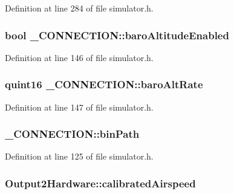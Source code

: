 Definition at line 284 of file simulator.\-h.

\hypertarget{group___h_i_t_l_plugin_ga6700d3be0f4ef9211d6f34569034b7a8}{
\subsubsection[{baro\-Altitude\-Enabled}]{\setlength{\rightskip}{0pt plus 5cm}bool \-\_\-\-C\-O\-N\-N\-E\-C\-T\-I\-O\-N\-::baro\-Altitude\-Enabled}}\label{group___h_i_t_l_plugin_ga6700d3be0f4ef9211d6f34569034b7a8}


Definition at line 146 of file simulator.\-h.

\hypertarget{group___h_i_t_l_plugin_gab5b66abe21b9a0f00b2dc2bbb28cac6c}{
\subsubsection[{baro\-Alt\-Rate}]{\setlength{\rightskip}{0pt plus 5cm}quint16 \-\_\-\-C\-O\-N\-N\-E\-C\-T\-I\-O\-N\-::baro\-Alt\-Rate}}\label{group___h_i_t_l_plugin_gab5b66abe21b9a0f00b2dc2bbb28cac6c}


Definition at line 147 of file simulator.\-h.

\hypertarget{group___h_i_t_l_plugin_ga7bd6d35f193af2ec2365db4a4faaf7e7}{
\subsubsection[{bin\-Path}]{ \-\_\-\-C\-O\-N\-N\-E\-C\-T\-I\-O\-N\-::bin\-Path}}\label{group___h_i_t_l_plugin_ga7bd6d35f193af2ec2365db4a4faaf7e7}


Definition at line 125 of file simulator.\-h.

\hypertarget{group___h_i_t_l_plugin_gaa6ec37dae61764737236528ba5a2445c}{
\subsubsection[{calibrated\-Airspeed}]{ Output2\-Hardware\-::calibrated\-Airspeed}}\label{group___h_i_t_l_plugin_gaa6ec37dae61764737236528ba5a2445c}



